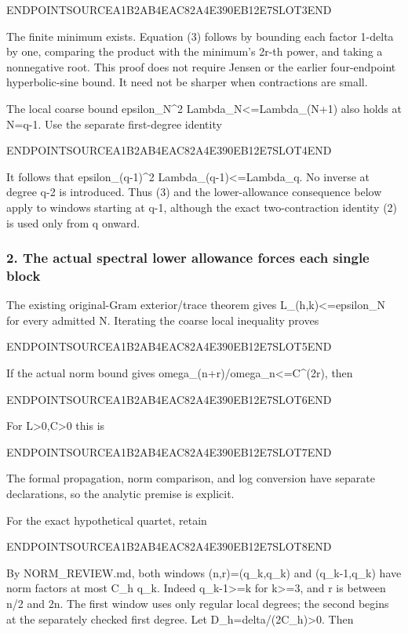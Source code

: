 ENDPOINTSOURCEA1B2AB4EAC82A4E390EB12E7SLOT3END

The finite minimum exists. Equation (3) follows by bounding each factor 1-delta by one, comparing the product with the minimum's 2r-th power, and taking a nonnegative root. This proof does not require Jensen or the earlier four-endpoint hyperbolic-sine bound. It need not be sharper when contractions are small.

The local coarse bound epsilon\_N\^{}2 Lambda\_N\textless=Lambda\_(N+1) also holds at N=q-1. Use the separate first-degree identity

ENDPOINTSOURCEA1B2AB4EAC82A4E390EB12E7SLOT4END

It follows that epsilon\_(q-1)\^{}2 Lambda\_(q-1)\textless=Lambda\_q. No inverse at degree q-2 is introduced. Thus (3) and the lower-allowance consequence below apply to windows starting at q-1, although the exact two-contraction identity (2) is used only from q onward.

\subsubsection{2. The actual spectral lower allowance forces each single block}\label{endpoint-pr25_consecutive_original--the-actual-spectral-lower-allowance-forces-each-single-block}

The existing original-Gram exterior/trace theorem gives L\_(h,k)\textless=epsilon\_N for every admitted N. Iterating the coarse local inequality proves

ENDPOINTSOURCEA1B2AB4EAC82A4E390EB12E7SLOT5END

If the actual norm bound gives omega\_(n+r)/omega\_n\textless=C\^{}(2r), then

ENDPOINTSOURCEA1B2AB4EAC82A4E390EB12E7SLOT6END

For L\textgreater0,C\textgreater0 this is

ENDPOINTSOURCEA1B2AB4EAC82A4E390EB12E7SLOT7END

The formal propagation, norm comparison, and log conversion have separate declarations, so the analytic premise is explicit.

For the exact hypothetical quartet, retain

ENDPOINTSOURCEA1B2AB4EAC82A4E390EB12E7SLOT8END

By NORM\_REVIEW.md, both windows (n,r)=(q\_k,q\_k) and (q\_k-1,q\_k) have norm factors at most C\_h q\_k. Indeed q\_k-1\textgreater=k for k\textgreater=3, and r is between n/2 and 2n. The first window uses only regular local degrees; the second begins at the separately checked first degree. Let D\_h=delta/(2C\_h)\textgreater0. Then

